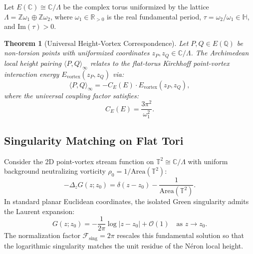 \documentclass[11pt,reqno]{amsart}
\newtheorem{theorem}{Theorem}[section]
\theoremstyle{definition}
\begin{document}
Let $E(\mathbb{C}) \cong \mathbb{C}/\Lambda$ be the complex torus uniformized by the lattice $\Lambda = \mathbb{Z}\omega_1 \oplus \mathbb{Z}\omega_2$, where $\omega_1 \in \mathbb{R}_{>0}$ is the real fundamental period, $\tau = \omega_2 / \omega_1 \in \mathbb{H}$, and $\text{Im}(\tau) > 0$.

\begin{theorem}[Universal Height-Vortex Correspondence]
\label{thm:universal_scaling}
Let $P, Q \in E(\mathbb{Q})$ be non-torsion points with uniformized coordinates $z_P, z_Q \in \mathbb{C}/\Lambda$. The Archimedean local height pairing $\langle P, Q \rangle_\infty$ relates to the flat-torus Kirchhoff point-vortex interaction energy $E_{\mathrm{vortex}}(z_P, z_Q)$ via:
\begin{equation}
\langle P, Q \rangle_\infty = - C_E(E) \cdot E_{\mathrm{vortex}}(z_P, z_Q),
\end{equation}
where the universal coupling factor satisfies:
\begin{equation}
C_E(E) = \frac{3\pi^2}{\omega_1^2}.
\end{equation}
\end{theorem}

\subsection{Singularity Matching on Flat Tori}
Consider the 2D point-vortex stream function on $\mathbb{T}^2 \cong \mathbb{C}/\Lambda$ with uniform background neutralizing vorticity $\rho_0 = 1/\mathrm{Area}(\mathbb{T}^2)$:
\begin{equation}
-\Delta_z G(z; z_0) = \delta(z - z_0) - \frac{1}{\mathrm{Area}(\mathbb{T}^2)}.
\end{equation}
In standard planar Euclidean coordinates, the isolated Green singularity admits the Laurent expansion:
\begin{equation}
G(z; z_0) = -\frac{1}{2\pi} \log |z - z_0| + \mathcal{O}(1) \quad \text{as } z \to z_0.
\end{equation}
The normalization factor $\mathcal{F}_{\mathrm{sing}} = 2\pi$ rescales this fundamental solution so that the logarithmic singularity matches the unit residue of the Néron local height.
\end{document}
